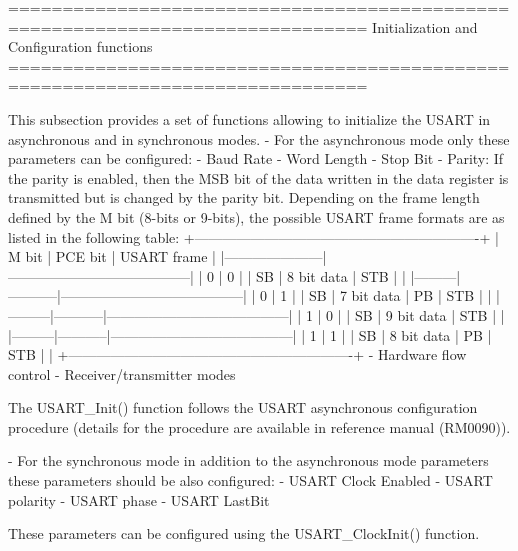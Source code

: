 \begin{DoxyVerb} ===============================================================================
                  Initialization and Configuration functions
 ===============================================================================  

  This subsection provides a set of functions allowing to initialize the USART 
  in asynchronous and in synchronous modes.
   - For the asynchronous mode only these parameters can be configured: 
        - Baud Rate
        - Word Length 
        - Stop Bit
        - Parity: If the parity is enabled, then the MSB bit of the data written
          in the data register is transmitted but is changed by the parity bit.
          Depending on the frame length defined by the M bit (8-bits or 9-bits),
          the possible USART frame formats are as listed in the following table:
   +-------------------------------------------------------------+     
   |   M bit |  PCE bit  |            USART frame                |
   |---------------------|---------------------------------------|             
   |    0    |    0      |    | SB | 8 bit data | STB |          |
   |---------|-----------|---------------------------------------|  
   |    0    |    1      |    | SB | 7 bit data | PB | STB |     |
   |---------|-----------|---------------------------------------|  
   |    1    |    0      |    | SB | 9 bit data | STB |          |
   |---------|-----------|---------------------------------------|  
   |    1    |    1      |    | SB | 8 bit data | PB | STB |     |
   +-------------------------------------------------------------+            
        - Hardware flow control
        - Receiver/transmitter modes

  The USART_Init() function follows the USART  asynchronous configuration procedure
  (details for the procedure are available in reference manual (RM0090)).

  - For the synchronous mode in addition to the asynchronous mode parameters these 
    parameters should be also configured:
        - USART Clock Enabled
        - USART polarity
        - USART phase
        - USART LastBit
  
  These parameters can be configured using the USART_ClockInit() function.\end{DoxyVerb}
 

